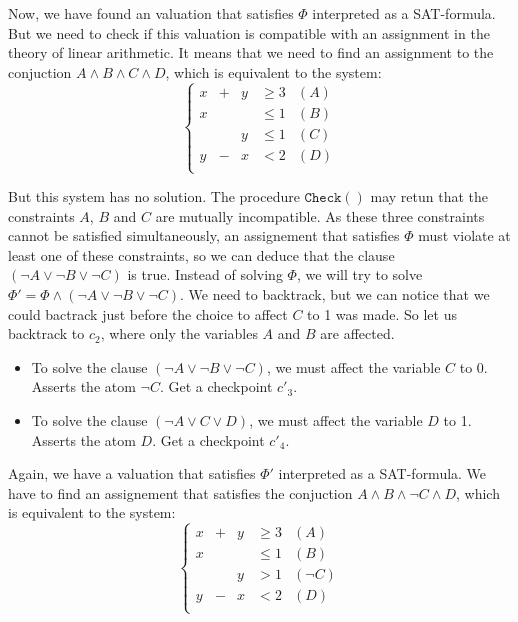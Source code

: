 \documentclass{article}
\newcommand{\icheck}{\mathtt{Check}()}
\begin{document}
Now, we have found an valuation that satisfies $\Phi$ interpreted as a
SAT-formula. But we need to check if this valuation is compatible with an
assignment in the theory of linear arithmetic. It means that we need to find an
assignment to the conjuction $A \wedge B \wedge C \wedge D$, which is equivalent
to the system:
\begin{displaymath}
  \left\{
  \begin{array}{ccccr}
    x  & + & y & \geqslant 3 & (A) \\
    x  &   &   & \leqslant 1 & (B) \\
       &   & y & \leqslant 1 & (C) \\
    y  & - & x & < 2         & (D) \\
  \end{array}
  \right.
\end{displaymath}

But this system has no solution. The procedure $\icheck$ may retun that the
constraints $A$, $B$ and $C$ are mutually incompatible. As these three
constraints cannot be satisfied simultaneously, an assignement that satisfies
$\Phi$ must violate at least one of these constraints, so we can deduce that the
clause $(\neg A \vee \neg B \vee \neg C)$ is true. Instead of solving $\Phi$, we
will try to solve $\Phi' = \Phi \wedge (\neg A \vee \neg B \vee \neg C)$. We
need to backtrack, but we can notice that we could bactrack just before
the choice to affect $C$ to 1 was made. So let us backtrack to $c_2$, where only
the variables $A$ and $B$ are affected.

\begin{itemize}
  \item To solve the clause $(\neg A \vee \neg B \vee \neg C)$, we must affect
    the variable $C$ to 0. Asserts the atom $\neg C$. Get a checkpoint $c'_3$.
  \item To solve the clause $(\neg A \vee C \vee D)$, we must affect the
    variable $D$ to 1. Asserts the atom $D$. Get a checkpoint $c'_4$.
\end{itemize}

Again, we have a valuation that satisfies $\Phi'$ interpreted as a
SAT-formula. We have to find an assignement that satisfies the conjuction
$A \wedge B \wedge \neg C \wedge D$, which is equivalent
to the system:
\begin{displaymath}
  \left\{
  \begin{array}{ccccr}
    x  & + & y & \geqslant 3 & (A) \\
    x  &   &   & \leqslant 1 & (B) \\
       &   & y & > 1         & (\neg C) \\
    y  & - & x & < 2         & (D) \\
  \end{array}
  \right.
\end{displaymath}
\end{document}
